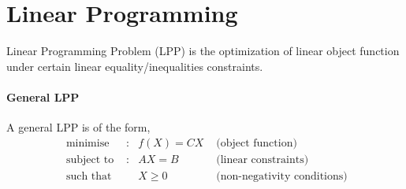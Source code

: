 

\section{Linear Programming}
\begin{definition}[LPP]
Linear Programming Problem (LPP) is the optimization of linear object function under certain linear equality/inequalities constraints.
\end{definition}
\paragraph{General LPP}
A general LPP is of the form,
\begin{align}
	\text{ minimise } & : & f(X) = CX  & \text{ (object function)} \label{eqn:obj} \\
	\text{ subject to } & : & AX = B & \text{ (linear constraints)}\label{eqn:sub} \\
	\text{ such that } & & X \ge 0 & \text{ (non-negativity conditions)}\label{eqn:positive}
\end{align}

